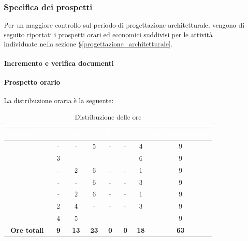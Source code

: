 \subsubsection{Specifica dei prospetti}
Per un maggiore controllo sul periodo di progettazione architetturale, vengono di seguito riportati i prospetti orari ed economici suddivisi per le attività individuate nella sezione \S\ref{progettazione_architetturale}.
\paragraph{Incremento e verifica documenti}
\paragraph*{Prospetto orario}
La distribuzione oraria è la seguente:
\begin{table}[H]
	\begin{center}
		\begin{tabular}{ |c c c c c c c c| }
			\rowcolor{darkblue} 
			\textcolor{white}{\textbf{Nominativo}} & \textcolor{white}{\textbf{Re}} & \textcolor{white}{\textbf{Am}} & \textcolor{white}{\textbf{An}} & \textcolor{white}{\textbf{Pt}} & \textcolor{white}{\textbf{Pr}} & \textcolor{white}{\textbf{Ve}} & \textcolor{white}{\textbf{Ore Complessive}} \\ \hline
			\BL 	& -  	& -  	& 5 	& - 	& - 	& 4 	& 9 \\ \hline
			\FF 	& 3  	& -  	& - 	& - 	& - 	& 6  	& 9 \\ \hline
			\MM 	& -  	& 2  	& 6 	& -		& - 	& 1  	& 9 \\ \hline
			\PC 	& - 	& -  	& 6 	& - 	& - 	& 3 	& 9 \\ \hline
			\TG 	& -  	& 2 	& 6 	& - 	& - 	& 1 	& 9 \\ \hline
			\TL 	& 2  	& 4 	& - 	& - 	& - 	& 3 	& 9 \\ \hline
			\VD 	& 4  	& 5  	& - 	& - 	& - 	& -  	& 9 \\ \hline
			\textbf{Ore totali} & \textbf{9} & \textbf{13} & \textbf{23} & \textbf{0} & \textbf{0} & \textbf{18} & \textbf{63} \\ \hline
		\end{tabular}
		\caption{Distribuzione delle ore}
	\end{center}
\end{table}
